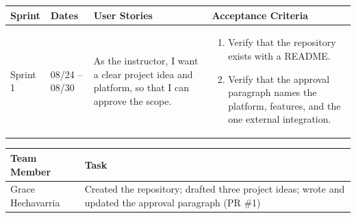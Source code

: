 \documentclass[12pt]{article}
\begin{document}
\noindent\begin{minipage}{\linewidth}

\vspace{0.5em}
\noindent
\begin{tabular}{|L{1.2cm}|L{1.8cm}|L{5.2cm}|L{6.3cm}|}
\hline
\textbf{Sprint} & \textbf{Dates} & \textbf{User Stories} & \textbf{Acceptance Criteria} \\
\hline
Sprint 1 & 08/24 -- 08/30 &
As the instructor, I want a clear project idea and platform, so that I can approve the scope. &
\begin{enumerate}
    \item Verify that the repository exists with a README.
    \item Verify that the approval paragraph names the platform, features, and the one external integration.
\end{enumerate} \\
\hline
\end{tabular}

\vspace{0.5em}
\noindent
\begin{tabular}{|L{3.4cm}|L{11.6cm}|}
\hline
\textbf{Team Member} & \textbf{Task} \\
\hline
Grace Hechavarria & Created the repository; drafted three project ideas; wrote and updated the approval paragraph (PR \#1) \\
\hline
\end{tabular}
\end{minipage}

\vspace{1.5em}
\end{document}
